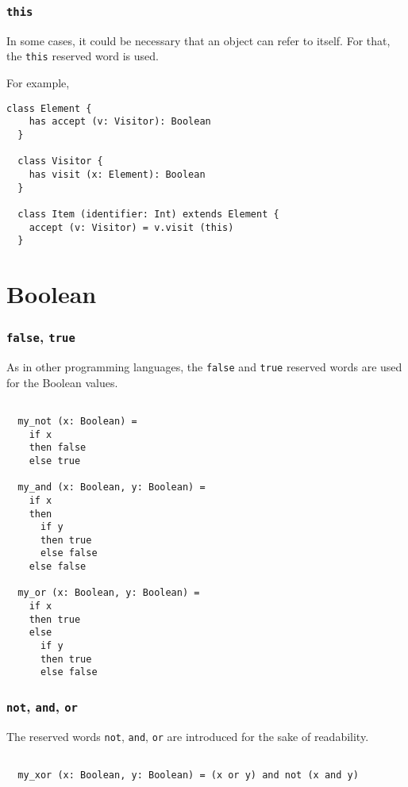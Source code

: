 \documentclass[12pt,a4paper]{book}
\newcommand{\srccode}[1]{\texttt{{#1}}}
\newcommand{\reservedWord}[1]{{\color{blue}\srccode{#1}}\xspace}
\newcommand{\sthis}{\reservedWord{this}}
\newcommand{\sfalse}{\reservedWord{false}}
\newcommand{\strue}{\reservedWord{true}}
\newcommand{\snot}{\reservedWord{not}}
\newcommand{\sand}{\reservedWord{and}}
\newcommand{\sor}{\reservedWord{or}}
\begin{document}
    \subsubsection{\sthis}

    In some cases, it could be necessary that an object can refer to itself.
    For that, the \sthis reserved word is used.

    For example,
    \begin{lstlisting}[label={lst:exampleExtendsElement}]
  class Element {
    has accept (v: Visitor): Boolean
  }

  class Visitor {
    has visit (x: Element): Boolean
  }

  class Item (identifier: Int) extends Element {
    accept (v: Visitor) = v.visit (this)
  }
    \end{lstlisting}


    \section{Boolean}

    \subsubsection{\sfalse, \strue}

    As in other programming languages, the \sfalse and \strue reserved words are used for the Boolean values.

    \begin{lstlisting}[label={lst:exampleFalseTrue}]

  my_not (x: Boolean) =
    if x
    then false
    else true

  my_and (x: Boolean, y: Boolean) =
    if x
    then
      if y
      then true
      else false
    else false

  my_or (x: Boolean, y: Boolean) =
    if x
    then true
    else
      if y
      then true
      else false
    \end{lstlisting}

    \subsubsection{\snot, \sand, \sor}

    The reserved words \snot, \sand, \sor are introduced for the sake of readability.

    \begin{lstlisting}[label={lst:exampleNotAndOr}]

  my_xor (x: Boolean, y: Boolean) = (x or y) and not (x and y)

    \end{lstlisting}
\end{document}
